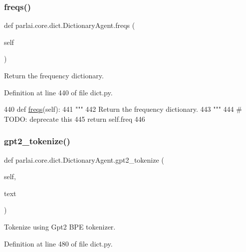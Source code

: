\subsubsection{\texorpdfstring{freqs()}{freqs()}}
{\footnotesize\ttfamily def parlai.\+core.\+dict.\+Dictionary\+Agent.\+freqs (\begin{DoxyParamCaption}\item[{}]{self }\end{DoxyParamCaption})}

\begin{DoxyVerb}Return the frequency dictionary.
\end{DoxyVerb}
 

Definition at line 440 of file dict.\+py.


\begin{DoxyCode}
440     \textcolor{keyword}{def }\hyperlink{namespaceparlai_1_1agents_1_1tfidf__retriever_1_1build__tfidf_a82fd1621e57caaa8ff7a9c27b0e94125}{freqs}(self):
441         \textcolor{stringliteral}{"""}
442 \textcolor{stringliteral}{        Return the frequency dictionary.}
443 \textcolor{stringliteral}{        """}
444         \textcolor{comment}{# TODO: deprecate this}
445         \textcolor{keywordflow}{return} self.freq
446 
\end{DoxyCode}
\mbox{\label{classparlai_1_1core_1_1dict_1_1DictionaryAgent_a57685af2fcd0a684b7102c55afe0c8ad}} 
\subsubsection{\texorpdfstring{gpt2\+\_\+tokenize()}{gpt2\_tokenize()}}
{\footnotesize\ttfamily def parlai.\+core.\+dict.\+Dictionary\+Agent.\+gpt2\+\_\+tokenize (\begin{DoxyParamCaption}\item[{}]{self,  }\item[{}]{text }\end{DoxyParamCaption})}

\begin{DoxyVerb}Tokenize using Gpt2 BPE tokenizer.
\end{DoxyVerb}
 

Definition at line 480 of file dict.\+py.


